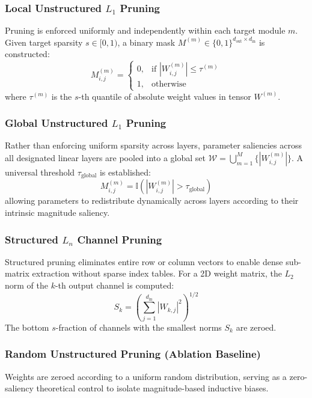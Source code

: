 \documentclass[conference]{IEEEtran}
\begin{document}
\subsubsection{Local Unstructured $L_1$ Pruning}
Pruning is enforced uniformly and independently within each target module $m$. Given target sparsity $s \in [0, 1)$, a binary mask $M^{(m)} \in \{0, 1\}^{d_{\text{out}} \times d_{\text{in}}}$ is constructed:
\begin{equation}
M_{i,j}^{(m)} = \begin{cases} 
0, & \text{if } |W_{i,j}^{(m)}| \le \tau^{(m)} \\ 
1, & \text{otherwise} 
\end{cases}
\label{eq:local_pruning}
\end{equation}
where $\tau^{(m)}$ is the $s$-th quantile of absolute weight values in tensor $W^{(m)}$.

\subsubsection{Global Unstructured $L_1$ Pruning}
Rather than enforcing uniform sparsity across layers, parameter saliencies across all designated linear layers are pooled into a global set $\mathcal{W} = \bigcup_{m=1}^{M} \{ |W_{i,j}^{(m)}| \}$. A universal threshold $\tau_{\text{global}}$ is established:
\begin{equation}
M_{i,j}^{(m)} = \mathbb{I}\left( |W_{i,j}^{(m)}| > \tau_{\text{global}} \right)
\label{eq:global_pruning}
\end{equation}
allowing parameters to redistribute dynamically across layers according to their intrinsic magnitude saliency.

\subsubsection{Structured $L_n$ Channel Pruning}
Structured pruning eliminates entire row or column vectors to enable dense sub-matrix extraction without sparse index tables. For a 2D weight matrix, the $L_2$ norm of the $k$-th output channel is computed:
\begin{equation}
S_k = \left( \sum_{j=1}^{d_{\text{in}}} |W_{k,j}|^2 \right)^{1/2}
\label{eq:structured_pruning}
\end{equation}
The bottom $s$-fraction of channels with the smallest norms $S_k$ are zeroed.

\subsubsection{Random Unstructured Pruning (Ablation Baseline)}
Weights are zeroed according to a uniform random distribution, serving as a zero-saliency theoretical control to isolate magnitude-based inductive biases.
\end{document}
